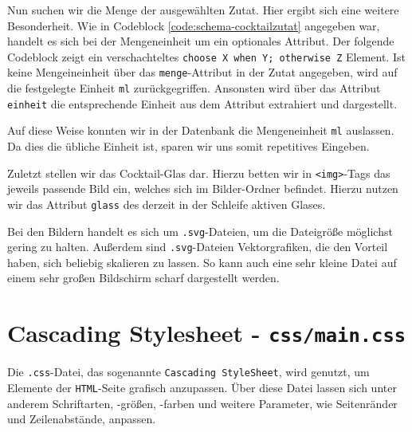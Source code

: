 Nun suchen wir die Menge der ausgewählten Zutat. Hier ergibt sich eine weitere Besonderheit. Wie in Codeblock \ref{code:schema-cocktailzutat} angegeben war, handelt es sich bei der Mengeneinheit um ein optionales Attribut. Der folgende Codeblock zeigt ein verschachteltes \texttt{choose X when Y; otherwise Z} Element. Ist keine Mengeineinheit über das \texttt{menge}-Attribut in der Zutat angegeben, wird auf die festgelegte Einheit \texttt{ml} zurückgegriffen. Ansonsten wird über das Attribut \texttt{einheit} die entsprechende Einheit aus dem Attribut extrahiert und dargestellt.

Auf diese Weise konnten wir in der Datenbank die Mengeneinheit \texttt{ml} auslassen. Da dies die übliche Einheit ist, sparen wir uns somit repetitives Eingeben.









Zuletzt stellen wir das Cocktail-Glas dar. Hierzu betten wir in \texttt{<img>}-Tags das jeweils passende Bild ein, welches sich im Bilder-Ordner befindet. Hierzu nutzen wir das Attribut \texttt{glass} des derzeit in der Schleife aktiven Glases.

Bei den Bildern handelt es sich um \texttt{.svg}-Dateien, um die Dateigröße möglichst gering zu halten. Außerdem sind \texttt{.svg}-Dateien Vektorgrafiken, die den Vorteil haben, sich beliebig skalieren zu lassen. So kann auch eine sehr kleine Datei auf einem sehr großen Bildschirm scharf dargestellt werden.









\section{Cascading Stylesheet - \texttt{css/main.css}}
\label{section:css}

Die \texttt{.css}-Datei, das sogenannte \texttt{Cascading StyleSheet}, wird genutzt, um Elemente der \texttt{HTML}-Seite grafisch anzupassen. Über diese Datei lassen sich unter anderem Schriftarten, -größen, -farben und weitere Parameter, wie Seitenränder und Zeilenabstände, anpassen.

